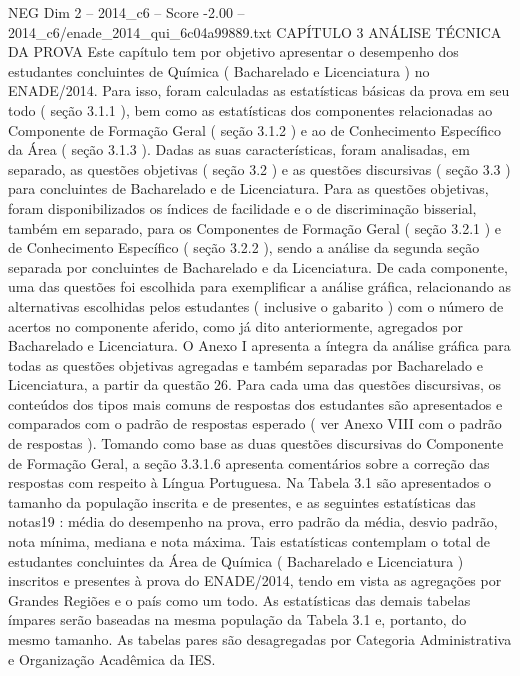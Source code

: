 \begin{textsample}{NEG Dim 2 – 2014\_c6 – Score -2.00 – 2014\_c6/enade\_2014\_qui\_6c04a99889.txt}  \label{ex:f2_neg_202}
CAPÍTULO 3 ANÁLISE TÉCNICA DA PROVA Este capítulo tem por objetivo apresentar o desempenho dos estudantes concluintes de Química ( Bacharelado e Licenciatura ) no ENADE/2014.
Para isso, foram calculadas as estatísticas básicas da prova em seu todo ( seção 3.1.1 ), bem como as estatísticas dos componentes relacionadas ao Componente de Formação Geral ( seção 3.1.2 ) e ao de Conhecimento Específico da Área ( seção 3.1.3 ).
Dadas as suas características, foram analisadas, em separado, as questões objetivas ( seção 3.2 ) e as questões discursivas ( seção 3.3 ) para concluintes de Bacharelado e de Licenciatura.
Para as questões objetivas, foram disponibilizados os índices de facilidade e o de discriminação bisserial, também em separado, para os Componentes de Formação Geral ( seção 3.2.1 ) e de Conhecimento Específico ( seção 3.2.2 ), sendo a análise da segunda seção separada por concluintes de Bacharelado e da Licenciatura.
De cada componente, uma das questões foi escolhida para exemplificar a análise gráfica, relacionando as alternativas escolhidas pelos estudantes ( inclusive o gabarito ) com o número de acertos no componente aferido, como já dito anteriormente, agregados por Bacharelado e Licenciatura.
O Anexo I apresenta a íntegra da análise gráfica para todas as questões objetivas agregadas e também separadas por Bacharelado e Licenciatura, a partir da questão 26.
Para cada uma das questões discursivas, os conteúdos dos tipos mais comuns de respostas dos estudantes são apresentados e comparados com o padrão de respostas esperado ( ver Anexo VIII com o padrão de respostas ).
Tomando como base as duas questões discursivas do Componente de Formação Geral, a seção 3.3.1.6 apresenta comentários sobre a correção das respostas com respeito à Língua Portuguesa.
Na Tabela 3.1 são apresentados o tamanho da população inscrita e de presentes, e as seguintes estatísticas das notas19 : média do desempenho na prova, erro padrão da média, desvio padrão, nota mínima, mediana e nota máxima.
Tais estatísticas contemplam o total de estudantes concluintes da Área de Química ( Bacharelado e Licenciatura ) inscritos e presentes à prova do ENADE/2014, tendo em vista as agregações por Grandes Regiões e o país como um todo.
As estatísticas das demais tabelas ímpares serão baseadas na mesma população da Tabela 3.1 e, portanto, do mesmo tamanho.
As tabelas pares são desagregadas por Categoria Administrativa e Organização Acadêmica da IES.

\end{textsample}
